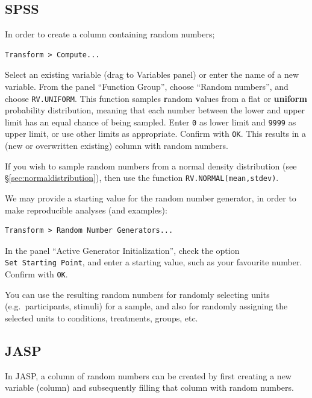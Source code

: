 \documentclass[
]{book}
\begin{document}
\hypertarget{spss}{%
\subsection{SPSS}\label{spss}}

In order to create a column containing random numbers;

\begin{verbatim}
Transform > Compute...
\end{verbatim}

Select an existing variable (drag to Variables panel) or enter the name of a new variable.
From the panel ``Function Group'', choose ``Random numbers'', and choose \texttt{RV.UNIFORM}.
This function samples \textbf{r}andom \textbf{v}alues from a flat or \textbf{uniform} probability distribution, meaning that each number between the lower and upper limit has an equal chance of being sampled.
Enter \texttt{0} as lower limit and \texttt{9999} as upper limit, or use other limits as appropriate.
Confirm with \texttt{OK}.
This results in a (new or overwritten existing) column with random numbers.

If you wish to sample random numbers from a normal density distribution (see §\ref{sec:normaldistribution}), then use the function \texttt{RV.NORMAL(mean,stdev)}.

We may provide a starting value for the random number generator, in order to make reproducible analyses (and examples):

\begin{verbatim}
Transform > Random Number Generators...
\end{verbatim}

In the panel ``Active Generator Initialization'', check the option \texttt{Set\ Starting\ Point}, and enter a starting value, such as your favourite number. Confirm with \texttt{OK}.

You can use the resulting random numbers for randomly selecting units (e.g.~participants, stimuli) for a sample, and also for randomly assigning the selected units to conditions, treatments, groups, etc.

\hypertarget{jasp}{%
\subsection{JASP}\label{jasp}}

In JASP, a column of random numbers can be created by first creating a new variable (column) and subsequently filling that column with random numbers.
\end{document}
